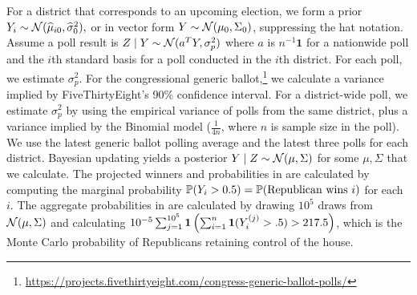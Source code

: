 \documentclass[12pt]{article}
\begin{document}
For a district that corresponds to an upcoming election, we form a prior 
$Y_i\sim \Norm(\hat \mu_{i0}, \hat \sigma_0^2),$ or in vector form $
Y \sim \Norm( \mu_0,  \Sigma_0)$, suppressing the hat notation. Assume a poll result is $Z \mid Y \sim \Norm(a^T Y, \sigma^2_p)$ where $a$ is $n^{-1}\bm 1$ for a nationwide poll and the $i$th standard basis for a poll conducted in the $i$th district. For each poll, we estimate $\sigma^2_p$. For the congressional generic ballot,\footnote{\url{https://projects.fivethirtyeight.com/congress-generic-ballot-polls/}} we calculate a variance implied by FiveThirtyEight's 90\% confidence interval. For a district-wide poll, we estimate $\sigma^2_p$ by using the empirical variance of polls from the same district, plus a variance implied by the Binomial model ($\frac{1}{4n}$, where $n$ is sample size in the poll). We use the latest generic ballot polling average and the latest three polls for each district. Bayesian updating yields a posterior $Y \mid Z \sim \Norm(\mu, \Sigma)$ for some $\mu, \Sigma$ that we calculate. The projected winners and probabilities in  are calculated by computing the marginal probability $\P(Y_i > 0.5) = \P(\text{Republican wins $i$})$ for each $i$. The aggregate probabilities in  are calculated by drawing $10^5$ draws from $\Norm(\mu,\Sigma)$ and calculating $10^{-5}\sum_{j=1}^{10^5} \bm 1\pr{\sum_{i=1}^{n} \bm 1(Y_i^{(j)} > .5) > 217.5}$, which is the Monte Carlo probability of Republicans retaining control of the house. 

\newpage

\end{document}
